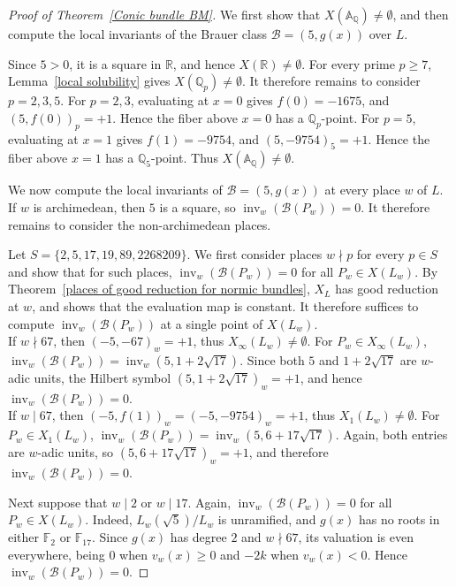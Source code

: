 \documentclass[10pt]{amsart}
\theoremstyle{plain}
\theoremstyle{definition}
\newcommand{\A}{{\mathbb A}}
\newcommand{\Q}{{\mathbb Q}}
\begin{document}
\begin{proof}[Proof of Theorem~\ref{Conic bundle BM}]
We first show that \(X(\A_{\Q})\neq\emptyset\), and then compute the local invariants of the Brauer class \(\mathcal{B}=(5,g(x))\) over \(L\).

Since \(5>0\), it is a square in \(\mathbb{R}\), and hence
\(X(\mathbb{R})\neq\emptyset\). For every prime \(p\ge7\),
Lemma~\ref{local solubility} gives
\(X(\mathbb{Q}_p)\neq\emptyset\). It therefore remains to consider
\(p=2,3,5\).
For \(p=2,3\), evaluating at \(x=0\) gives
\(f(0)=-1675\), and
\((5,f(0))_p=+1\). Hence the fiber above
\(x=0\) has a \(\mathbb{Q}_p\)-point. For \(p=5\), evaluating at \(x=1\) gives
\(f(1)=-9754\), and
\((5,-9754)_5=+1\). Hence the fiber above
\(x=1\) has a \(\mathbb{Q}_5\)-point.
Thus \(X(\mathbb{A}_{\mathbb{Q}})\neq\emptyset\).

We now compute the local invariants of
\(\mathcal{B}=(5,g(x))\)
at every place \(w\) of \(L\). If \(w\) is archimedean, then
\(5\) is a square, so
\(\operatorname{inv}_w(\mathcal{B}(P_w))=0\). It therefore remains to consider the non-archimedean places.

Let \(S=\{2,5,17,19,89,2268209\}\). We first consider places \(w\nmid p\) for every \(p\in S\) and show that for such places,
\(\operatorname{inv}_w(\mathcal{B}(P_w))=0\) for all \(P_w\in X(L_w)\). 
By Theorem~\ref{places of good reduction for normic bundles},
\(X_L\) has good reduction at \(w\), and
\cite[Theorem~13.3.15]{CS}
shows that the evaluation map is constant. It therefore suffices to compute
\(\operatorname{inv}_w(\mathcal{B}(P_w))\)
at a single point of
\(X(L_w)\).\\
If \(w\nmid67\), then \((-5,-67)_w=+1\), thus \(X_\infty(L_w) \neq \emptyset\). For \(P_w\in X_\infty(L_w)\),  \(\operatorname{inv}_w(\mathcal{B}(P_w))=\operatorname{inv}_w(5,1+2\sqrt{17})\). Since both \(5\) and \(1+2\sqrt{17}\) are \(w\)-adic units, the Hilbert symbol \((5,1+2\sqrt{17})_w=+1\), and hence \(\operatorname{inv}_w(\mathcal{B}(P_w))=0\).\\ 
If \(w\mid67\), then \((-5,f(1))_w =  (-5, -9754)_w=+1\), thus \(X_1(L_w) \neq \emptyset\). For \(P_w\in X_1(L_w)\), \(\operatorname{inv}_w(\mathcal{B}(P_w))= \operatorname{inv}_w(5,6+17\sqrt{17})\). Again, both entries are \(w\)-adic units, so \((5,6+17\sqrt{17})_w=+1\), and therefore \(\operatorname{inv}_w(\mathcal{B}(P_w))=0\).

Next suppose that \(w\mid2\) or \(w\mid17\). Again,
\(\operatorname{inv}_w(\mathcal{B}(P_w))=0\) for all
\(P_w\in X(L_w)\). Indeed,
\(L_w(\sqrt5)/L_w\) is unramified, and
\(g(x)\) has no roots in either \(\mathbb{F}_2\) or
\(\mathbb{F}_{17}\). Since \(g(x)\) has degree \(2\) and
\(w\nmid67\), its valuation is even everywhere, being \(0\) when
\(v_w(x)\ge0\) and \(-2k\) when \(v_w(x)<0\). Hence
\(\operatorname{inv}_w(\mathcal{B}(P_w))=0\).


\end{proof}
\end{document}
